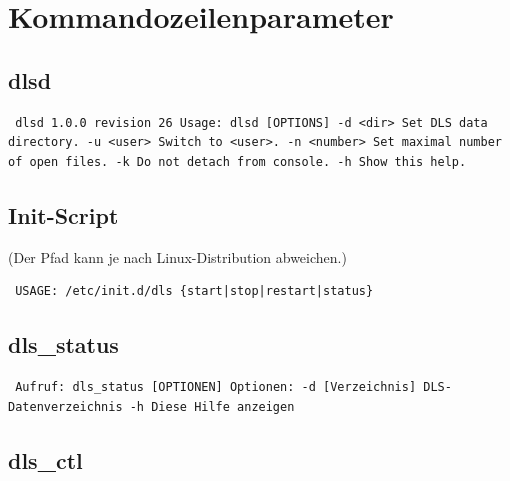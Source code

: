 \documentclass[a4paper,12pt,BCOR6mm,bibtotoc,idxtotoc]{scrbook}
\begin{document}

\chapter{Kommandozeilenparameter}


\section{dlsd} 

\begin{lstlisting} dlsd 1.0.0 revision 26 Usage: dlsd [OPTIONS] -d <dir> Set DLS data directory. -u <user> Switch to <user>. -n <number> Set maximal number of open files. -k Do not detach from console. -h Show this help. \end{lstlisting}


\section{Init-Script} 

(Der Pfad kann je nach Linux-Distribution abweichen.)

\begin{lstlisting} USAGE: /etc/init.d/dls {start|stop|restart|status} \end{lstlisting}


\section{dls\_status} 

\begin{lstlisting} Aufruf: dls_status [OPTIONEN] Optionen: -d [Verzeichnis] DLS-Datenverzeichnis -h Diese Hilfe anzeigen \end{lstlisting}


\section{dls\_ctl} \label{sec:apx_cmd_dlsctl} 
\end{document}

